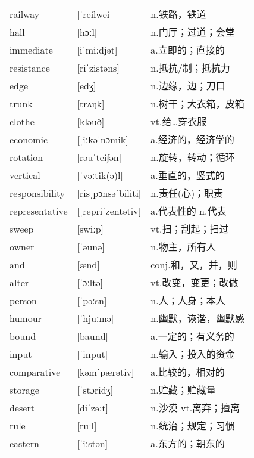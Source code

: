 \documentclass[a4paper]{article}
\begin{document}
\section{}
\begin{tabular}{l l l}

railway & [ˈreilwei] & n.铁路，铁道 \\
hall & [hɔːl] & n.门厅；过道；会堂 \\
immediate & [iˈmiːdjət] & a.立即的；直接的 \\
resistance & [riˈzistəns] & n.抵抗/制；抵抗力 \\
edge & [edʒ] & n.边缘，边；刀口 \\
trunk & [trʌŋk] & n.树干；大衣箱，皮箱 \\
clothe & [kləuð] & vt.给…穿衣服 \\
economic & [ˌiːkəˈnɔmik] & a.经济的，经济学的 \\
rotation & [rəuˈtei∫ən] & n.旋转，转动；循环 \\
vertical & [ˈvəːtik(ə)l] & a.垂直的，竖式的 \\
responsibility & [risˌpɔnsəˈbiliti] & n.责任(心)；职责 \\
representative & [ˌrepriˈzentətiv] & a.代表性的 n.代表 \\
sweep & [swiːp] & vt.扫；刮起；扫过 \\
owner & [ˈəunə] & n.物主，所有人 \\
and & [ænd] & conj.和，又，并，则 \\
alter & [ˈɔːltə] & vt.改变，变更；改做 \\
person & [ˈpəːsn] & n.人；人身；本人 \\
humour & [ˈhjuːmə] & n.幽默，诙谐，幽默感 \\
bound & [baund] & a.一定的；有义务的 \\
input & [ˈinput] & n.输入；投入的资金 \\
comparative & [kəmˈpærətiv] & a.比较的，相对的 \\
storage & [ˈstɔridʒ] & n.贮藏；贮藏量 \\
desert & [diˈzəːt] & n.沙漠 vt.离弃；擅离 \\
rule & [ruːl] & n.统治；规定；习惯 \\
eastern & [ˈiːstən] & a.东方的；朝东的 \\

\end{tabular}
\end{document}
